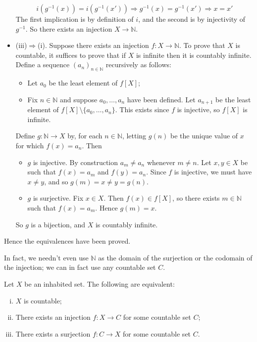 \begin{cproof}
\begin{itemize}
\[ i(g^{-1}(x))=i(g^{-1}(x')) \Rightarrow g^{-1}(x)=g^{-1}(x') \Rightarrow x=x' \]
The first implication is by definition of $i$, and the second is by injectivity of $g^{-1}$. So there exists an injection $X \to \mathbb{N}$.
\item (iii)$\Rightarrow$(i). Suppose there exists an injection $f : X \to \mathbb{N}$. To prove that $X$ is countable, it suffices to prove that if $X$ is infinite then it is countably infinite. Define a sequence $(a_n)_{n \in \mathbb{N}}$ recursively as follows:
\begin{itemize}
\item Let $a_0$ be the least element of $f[X]$;
\item Fix $n \in \mathbb{N}$ and suppose $a_0, \dots, a_n$ have been defined. Let $a_{n+1}$ be the least element of $f[X] \setminus \{ a_0, \dots, a_n \}$. This exists since $f$ is injective, so $f[X]$ is infinite. 
\end{itemize}
Define $g : \mathbb{N} \to X$ by, for each $n \in \mathbb{N}$, letting $g(n)$ be the unique value of $x$ for which $f(x)=a_n$. Then
\begin{itemize}
\item $g$ is injective. By construction $a_m \ne a_n$ whenever $m \ne n$. Let $x,y \in X$ be such that $f(x)=a_m$ and $f(y)=a_n$. Since $f$ is injective, we must have $x \ne y$, and so $g(m) = x \ne y = g(n)$.
\item $g$ is surjective. Fix $x \in X$. Then $f(x) \in f[X]$, so there exists $m \in \mathbb{N}$ such that $f(x)=a_m$. Hence $g(m)=x$.
\end{itemize}
So $g$ is a bijection, and $X$ is countably infinite.
\end{itemize}
Hence the equivalences have been proved.
\end{cproof}

In fact, we needn't even use $\mathbb{N}$ as the domain of the surjection or the codomain of the injection; we can in fact use any countable set $C$.

\begin{exercise}
\label{exCountabilityFromInjectionsAndSurjections}
Let $X$ be an inhabited set. The following are equivalent:
\begin{enumerate}[(i)]
\item \label{itmInjectionSurjectionCountableSets} $X$ is countable;
\item \label{itmInjectionIntoCountableSet} There exists an injection $f : X \to C$ for some countable set $C$;
\item \label{itmSurjectionFromCountableSet} There exists a surjection $f : C \to X$ for some countable set $C$.
\end{enumerate}
\end{exercise}

